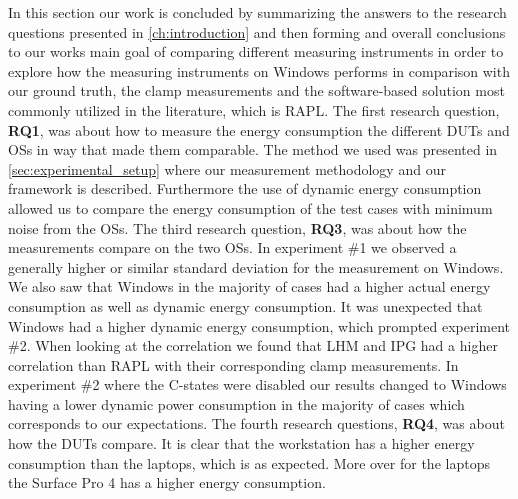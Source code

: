 
In this section our work is concluded by summarizing the answers to the research questions presented in \cref{ch:introduction} and then forming and overall conclusions to our works main goal of comparing different measuring instruments in order to explore how the measuring instruments on Windows performs in comparison with our ground truth, the clamp measurements and the software-based solution most commonly utilized in the literature, which is RAPL. The first research question, \textbf{RQ1}, was about how to measure the energy consumption the different DUTs and OSs in way that made them comparable. The method we used was presented in \cref{sec:experimental_setup} where our measurement methodology and our framework is described. Furthermore the use of dynamic energy consumption allowed us to compare the energy consumption of the test cases with minimum noise from the OSs. The third research question, \textbf{RQ3}, was about how the measurements compare on the two OSs. In experiment \#1 we observed a generally higher or similar standard deviation for the measurement on Windows. We also saw that Windows in the majority of cases had a higher actual energy consumption as well as dynamic energy consumption. It was unexpected that Windows had a higher dynamic energy consumption, which prompted experiment \#2. When looking at the correlation we found that LHM and IPG had a higher correlation than RAPL with their corresponding clamp measurements. In experiment \#2 where the C-states were disabled our results changed to Windows having a lower dynamic power consumption in the majority of cases which corresponds to our expectations.
The fourth research questions, \textbf{RQ4}, was about how the DUTs compare. It is clear that the workstation has a higher energy consumption than the laptops, which is as expected. More over for the laptops the Surface Pro 4 has a higher energy consumption. 


